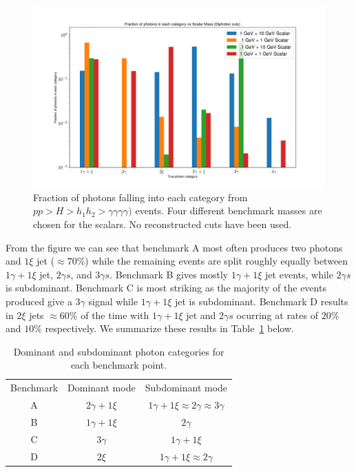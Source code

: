 \documentclass[aps,onecolumn,twoside,secnumarabic,balancelastpage,amsmath,amssymb,nofootinbib,hyperref=pdftex]{revtex4}
\begin{document}
\begin{figure}[t]
\begin{center}
\includegraphics[width=13cm]{toy_model_fractions.png}
\caption{Fraction of photons falling into each category from $ p p > H > h_{1} h_{2} > \gamma\gamma\gamma\gamma)$ events. Four different benchmark masses are chosen for the scalars. No reconstructed cuts have been used.}
\label{fig:toy_model_fractions}
\end{center}
\end{figure}
From the figure we can see that benchmark A most often produces two photons and $1\xi$ jet ($\approx 70\%$) while the remaining events are split roughly equally between $1\gamma + 1\xi$ jet,  $2\gamma s$, and $3\gamma s$. Benchmark B gives mostly $1\gamma + 1\xi$ jet events, while $2\gamma s$ is subdominant. Benchmark C is most striking as the majority of the events produced give a $3\gamma$ signal while $1\gamma + 1\xi$ jet is subdominant. Benchmark D results in $2\xi$ jets $\approx 60\%$ of the time with $1\gamma + 1\xi$ jet and $2\gamma s$ ocurring at rates of $20\%$ and $10\%$ respectively. We summarize these results in Table~\ref{table:dom} below.
\begin{table}[htp]
\caption{Dominant and subdominant photon categories for each benchmark point.}
\begin{center}
\begin{tabular}{c|c|c}
Benchmark & Dominant mode & Subdominant mode\\
A & $2\gamma + 1\xi$ & $1\gamma + 1\xi \approx 2\gamma \approx 3\gamma$\\
B & $1\gamma + 1\xi$ & $2\gamma$\\
C & $3\gamma$ & $1\gamma + 1\xi$\\
D & $2\xi$ & $1\gamma + 1\xi \approx 2\gamma$\\
\end{tabular}
\end{center}
\label{table:dom}
\end{table}
\end{document}
